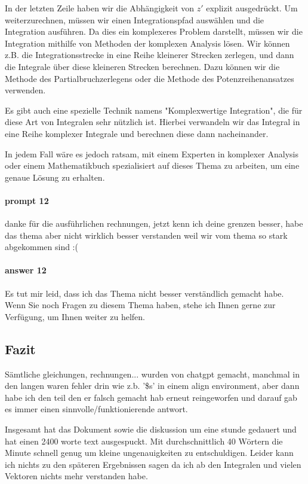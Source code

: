 \documentclass{article}
\begin{document}
In der letzten Zeile haben wir die Abhängigkeit von $z'$ explizit ausgedrückt.
Um weiterzurechnen, müssen wir einen Integrationspfad auswählen und die
Integration ausführen. Da dies ein komplexeres Problem darstellt, müssen wir
die Integration mithilfe von Methoden der komplexen Analysis lösen. Wir können
z.B. die Integrationsstrecke in eine Reihe kleinerer Strecken zerlegen, und
dann die Integrale über diese kleineren Strecken berechnen. Dazu können wir die
Methode des Partialbruchzerlegens oder die Methode des Potenzreihenansatzes
verwenden.

Es gibt auch eine spezielle Technik namens "Komplexwertige Integration", die
für diese Art von Integralen sehr nützlich ist. Hierbei verwandeln wir das
Integral in eine Reihe komplexer Integrale und berechnen diese dann
nacheinander.

In jedem Fall wäre es jedoch ratsam, mit einem Experten in komplexer Analysis
oder einem Mathematikbuch spezialisiert auf dieses Thema zu arbeiten, um eine
genaue Lösung zu erhalten.

\paragraph{prompt 12} %
\label{par:prompt 12}
danke für die ausführlichen rechnungen, jetzt kenn ich deine grenzen besser,
habe das thema aber nicht wirklich besser verstanden weil wir vom thema so
stark abgekommen sind :(

\paragraph{answer 12} %
\label{par:answer 12}
Es tut mir leid, dass ich das Thema nicht besser verständlich gemacht habe.
Wenn Sie noch Fragen zu diesem Thema haben, stehe ich Ihnen gerne zur
Verfügung, um Ihnen weiter zu helfen.

\subsection*{Fazit}
Sämtliche gleichungen, rechnungen... wurden von chatgpt gemacht, manchmal in
den langen waren fehler drin wie z.b. '\$s' in einem align environment, aber
dann habe ich den teil den er falsch gemacht hab erneut reingeworfen und darauf
gab es immer einen sinnvolle/funktionierende antwort.

Insgesamt hat das Dokument sowie die diskussion um eine stunde gedauert und hat
einen 2400 worte text ausgespuckt. Mit durchschnittlich 40 Wörtern die Minute
schnell genug um kleine ungenauigkeiten zu entschuldigen. Leider kann ich
nichts zu den späteren Ergebnissen sagen da ich ab den Integralen und vielen
Vektoren nichts mehr verstanden habe.
\end{document}
